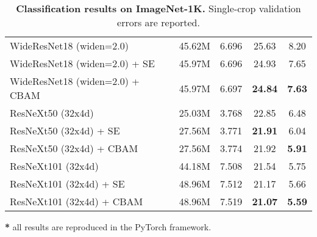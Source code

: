 \documentclass[runningheads]{llncs}
\newcommand*{\modulenameabb}{CBAM}
\begin{document}
\begin{table}[t]
\begin{center}
\begin{adjustbox}{max width=\textwidth}
\begin{tabular}{l|c|c|c|c }
WideResNet18 \cite{zagoruyko2016wide} (widen=2.0)                           & 45.62M & 6.696 & 25.63 & 8.20 \\
WideResNet18 \cite{zagoruyko2016wide} (widen=2.0) + SE~\cite{hu2017squeeze} & 45.97M & 6.696 & 24.93 & 7.65 \\
WideResNet18 \cite{zagoruyko2016wide} (widen=2.0) + \modulenameabb          & 45.97M & 6.697 & \textbf{24.84}& \textbf{7.63} \\

\hline
ResNeXt50 \cite{xie2016aggregated} (32x4d)                              & 25.03M & 3.768 & 22.85  & 6.48 \\
ResNeXt50 \cite{xie2016aggregated} (32x4d) + SE~\cite{hu2017squeeze}    & 27.56M & 3.771 & \textbf{21.91}  & 6.04 \\
ResNeXt50 \cite{xie2016aggregated} (32x4d) + \modulenameabb             & 27.56M & 3.774 & 21.92 & \textbf{5.91}\\
\hline

ResNeXt101 \cite{xie2016aggregated} (32x4d)                             & 44.18M & 7.508 & 21.54 & 5.75 \\
ResNeXt101 \cite{xie2016aggregated} (32x4d) + SE~\cite{hu2017squeeze}   & 48.96M & 7.512 & 21.17 & 5.66 \\
ResNeXt101 \cite{xie2016aggregated} (32x4d) + \modulenameabb            & 48.96M & 7.519 & \textbf{21.07} & \textbf{5.59} \\
\hline
\end{tabular}
\end{adjustbox}
\end{center}
\begin{tablenotes}
\scriptsize
\item \vspace{-3mm}\hspace*{\fill} \textbf{*} all results are reproduced in the PyTorch framework.
\end{tablenotes}
\caption{ \textbf{Classification results on ImageNet-1K.} Single-crop validation errors are reported.}
\label{table:imagenet_exp_1}
\vspace{-6mm}
\end{table} 
\end{document}
